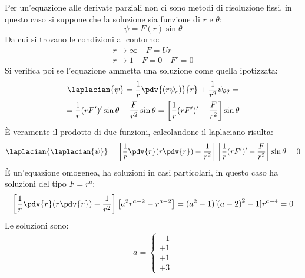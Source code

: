 %
Per un'equazione alle derivate parziali non ci sono metodi di risoluzione fissi, in questo caso si suppone che la soluzione sia funzione di $r$ e $\theta$:
%
	\begin{equation*}
		\psi = F(r) \sin{\theta}
	\end{equation*}
%
Da cui si trovano le condizioni al contorno:
%
	\begin{equation*}
		\begin{gathered}
			r \rightarrow \infty \quad F = U r\\
			r \rightarrow 1 \quad F = 0 \quad F' = 0
			\end{gathered}
\end{equation*}
%
Si verifica poi se l'equazione ammetta una soluzione come quella ipotizzata:
%
	\begin{equation*}
		\begin{gathered}
			\laplacian{\psi} = \frac{1}{r} \pdv{\left( r \psi_r \right)}{r}  + \frac{1}{r^2} \psi_{\theta \theta} =\\
			= \frac{1}{r} (r F')' \sin{\theta} - \frac{F}{r^2} \sin{\theta} = \left[ \frac{1}{r} (r F')' - \frac{F}{r^2} \right] \sin{\theta}
		\end{gathered}
	\end{equation*}
%
È veramente il prodotto di due funzioni, calcolandone il laplaciano risulta:
%
	\begin{equation*}
			\laplacian{\laplacian{\psi}} = \left[ \frac{1}{r} \pdv{r} (r \pdv{r})  - \frac{1}{r^2} \right] \left[ \frac{1}{r} (r F')' - \frac{F}{r^2} \right] \sin{\theta} = 0
	\end{equation*}
%
È un'equazione omogenea, ha soluzioni in casi particolari, in questo caso ha soluzioni del tipo $F = r^a$:
%
	\begin{equation*}
			\left[ \frac{1}{r}  \pdv{r} (r \pdv{r}) - \frac{1}{r^2} \right] \left[ a^2 r^{a-2} - r^{a - 2} \right] = (a^2 - 1) [{(a -2)}^2 - 1] r^{a-4} = 0
	\end{equation*}		
%	
Le soluzioni sono:
%
	\begin{equation*}	
		\begin{gathered}
			a = \left\{
				\begin{aligned}
					-1\\
					+1\\
					+1\\
					+3
				\end{aligned}
				\right.
		\end{gathered}
	\end{equation*}
